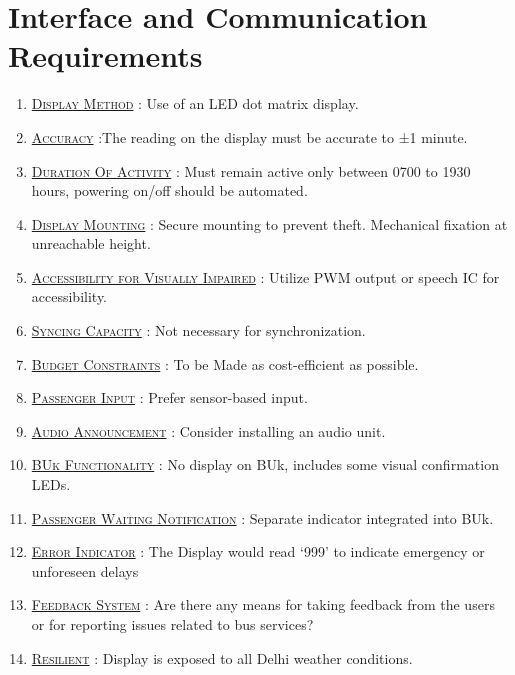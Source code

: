 \section{Interface and Communication Requirements}

\begin{enumerate}
    \item {}\underline{\textsc{Display Method}} : Use of an LED dot matrix display.

    \item \underline{\textsc{Accuracy}} :The reading on the display must be accurate to ±1 minute.

    \item \underline{\textsc{Duration Of Activity}} : Must remain active only between 0700 to 1930 hours, powering on/off should be automated.

    \item {}\underline{\textsc{Display Mounting}} : Secure mounting to prevent theft. Mechanical fixation at unreachable height.

    \item \underline{\textsc{Accessibility for Visually Impaired}} :  Utilize PWM output or speech IC for accessibility.

    \item {}\underline{\textsc{Syncing Capacity}} : Not necessary for synchronization.

    \item {}\underline{\textsc{Budget Constraints}} : To be Made as cost-efficient as possible.

    \item {}\underline{\textsc{Passenger Input}} : Prefer sensor-based input.

    \item \underline{\textsc{Audio Announcement}} : Consider installing an audio unit.

    \item {}\underline{\textsc{BUk Functionality}} : No display on BUk, includes some visual confirmation LEDs.

    \item \underline{\textsc{Passenger Waiting Notification}} : Separate indicator integrated into BUk.

    \item {}\underline{\textsc{Error Indicator}} : The Display would read ‘999’ to indicate emergency or unforeseen delays

    \item \underline{\textsc{Feedback System}} : Are there any means for taking feedback from the users or for reporting issues related to bus services?

    \item \underline{\textsc{Resilient}} : Display is exposed to all Delhi weather conditions.
   
\end{enumerate}